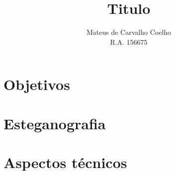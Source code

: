\documentclass[
	article,			%
	11pt,				%
	oneside,			%
	a4paper,			%
	hidelinks,
	english,			%
	brazil,				%
	sumario=abnt-6027-2012
	]{abntex2}
\title{Titulo}
\author{
	Mateus de Carvalho Coelho \\ R.A. 156675 %
}
\begin{document}
\maketitle

\tableofcontents*


\section{Objetivos}



\section{Esteganografia}



\section{Aspectos técnicos}
\end{document}
